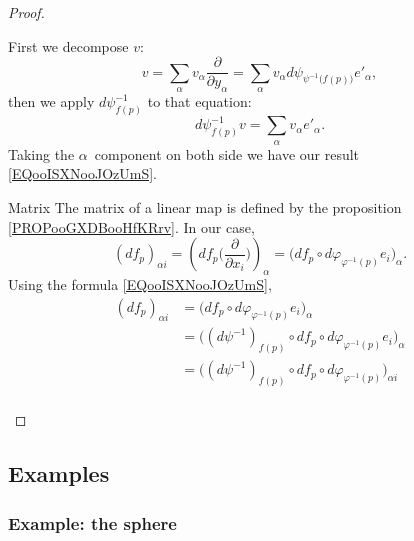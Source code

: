 \begin{proof}
\begin{subproof}
            First we decompose \( v\):
            \begin{equation}
                v=\sum_{\alpha}v_{\alpha}\frac{ \partial  }{ \partial y_{\alpha} }=\sum_{\alpha}v_{\alpha}d\psi_{\psi^{-1}\big( f(p) \big)}e'_{\alpha},
            \end{equation}
            then we apply \( d\psi^{-1}_{f(p)}\) to that equation:
            \begin{equation}
                d\psi^{-1}_{f(p)}v=\sum_{\alpha}v_{\alpha}e'_{\alpha}.
            \end{equation}
            Taking the \( \alpha\)\th\ component on both side we have our result \eqref{EQooISXNooJOzUmS}.
        \item[Matrix]
            The matrix of a linear map is defined by the proposition \ref{PROPooGXDBooHfKRrv}. In our case,
            \begin{equation}
                    (df_p)_{\alpha i}=\left( df_p\big( \frac{ \partial  }{ \partial x_i } \big) \right)_{\alpha} =\Big( df_p\circ d\varphi_{\varphi^{-1}(p)}e_i \Big)_{\alpha}.
            \end{equation}
            Using the formula \eqref{EQooISXNooJOzUmS},
            \begin{subequations}
                \begin{align}
                    (df_p)_{\alpha i}&=\Big( df_p\circ d\varphi_{\varphi^{-1}(p)}e_i \Big)_{\alpha}\\
                    &=\big( (d\psi^{-1})_{f(p)}\circ df_p\circ d\varphi_{\varphi^{-1}(p)}e_i \big)_{\alpha}\\
                    &=\big( (d\psi^{-1})_{f(p)}\circ df_p\circ d\varphi_{\varphi^{-1}(p)} \big)_{\alpha i}\\
                \end{align}
            \end{subequations}
    \end{subproof}
\end{proof}

\subsection{Examples}

\subsubsection{Example: the sphere}

